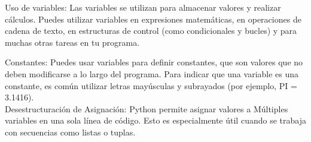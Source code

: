 Uso de variables: Las variables se utilizan para almacenar valores y realizar cálculos. Puedes utilizar variables en expresiones matemáticas, en operaciones de cadena de texto, en estructuras de control (como condicionales y bucles) y para muchas otras tareas en tu programa.\\

\begin{figure}[h]
    \centering
  \end{figure}

Constantes: Puedes usar variables para definir constantes, que son valores que no deben modificarse a lo largo del programa. Para indicar que una variable es una constante, es común utilizar letras mayúsculas y subrayados (por ejemplo, PI = 3.1416).\\

Desestructuración de Asignación: Python permite asignar valores a Múltiples variables en una sola línea de código. Esto es especialmente útil cuando se trabaja con secuencias como listas o tuplas.

\begin{figure}[h]
    \centering
  \end{figure}

